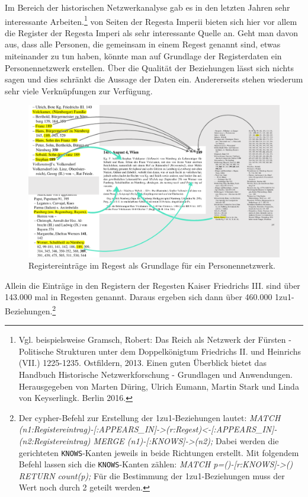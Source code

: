 \documentclass[ngerman,]{scrreprt}
\begin{document}
Im Bereich der historischen Netzwerkanalyse gab es in den letzten Jahren sehr interessante Arbeiten.\footnote{Vgl. beispielsweise Gramsch, Robert: Das Reich als Netzwerk der Fürsten - Politische Strukturen unter dem Doppelkönigtum Friedrichs II. und Heinrichs (VII.) 1225-1235. Ostfildern, 2013. Einen guten Überblick bietet das Handbuch Historische Netzwerkforschung - Grundlagen und Anwendungen. Herausgegeben von Marten Düring, Ulrich Eumann, Martin Stark und Linda von Keyserlingk. Berlin 2016.} von Seiten der Regesta Imperii bieten sich hier vor allem die Register der Regesta Imperi als sehr interessante Quelle an. Geht man davon aus, dass alle Personen, die gemeinsam in einem Regest genannt sind, etwas miteinander zu tun haben, könnte man auf Grundlage der Registerdaten ein Personennetzwerk erstellen. Über die Qualität der Beziehungen lässt sich nichts sagen und dies schränkt die Aussage der Daten ein. Andererseits stehen wiederum sehr viele Verknüpfungen zur Verfügung.

\begin{figure}
\centering
\includegraphics{Bilder/Register-und-Regest-19-189.png}
\caption{Registereinträge im Regest als Grundlage für ein Personennetzwerk.}
\end{figure}

Allein die Einträge in den Registern der Regesten Kaiser Friedrichs III. sind über 143.000 mal in Regesten genannt. Daraus ergeben sich dann über 460.000 1zu1-Beziehungen.\footnote{Der cypher-Befehl zur Erstellung der 1zu1-Beziehungen lautet: \emph{MATCH (n1:Registereintrag)-{[}:APPEARS\_IN{]}-\textgreater{}(r:Regest)\textless{}-{[}:APPEARS\_IN{]}-(n2:Registereintrag) MERGE (n1)-{[}:KNOWS{]}-\textgreater{}(n2);} Dabei werden die gerichteten \texttt{KNOWS}-Kanten jeweils in beide Richtungen erstellt. Mit folgendem Befehl lassen sich die \texttt{KNOWS}-Kanten zählen: \emph{MATCH p=()-{[}r:KNOWS{]}-\textgreater{}() RETURN count(p);} Für die Bestimmung der 1zu1-Beziehungen muss der Wert noch durch 2 geteilt werden.}
\end{document}
